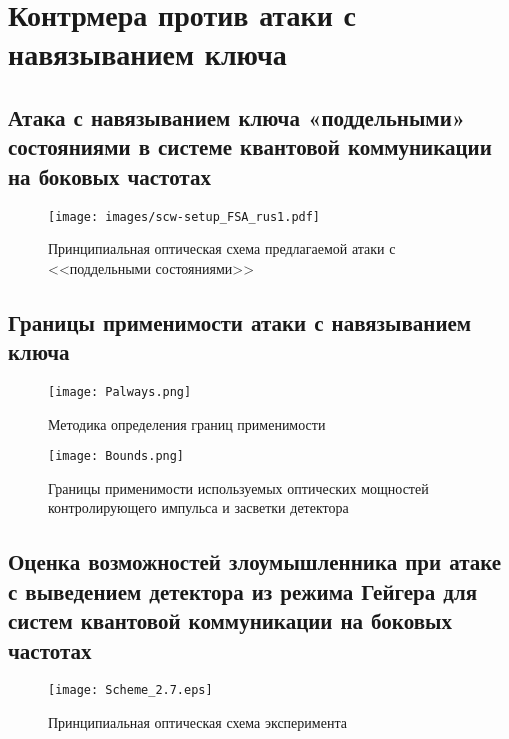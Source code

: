 \chapter{Контрмера против атаки с навязыванием ключа} \label{ch:ch3}


\section{Атака с навязыванием ключа «поддельными» состояниями в системе квантовой коммуникации на боковых частотах} \label{sec:ch3/sec1}

 \begin{figure}[ht]
  \centering
  \texttt{[image: images/scw-setup\_FSA\_rus1.pdf]}
  \caption{Принципиальная оптическая схема предлагаемой атаки с <<поддельными состояниями>>}
  \label{fig:SCW_FSA}
\end{figure}

\pagebreak
\section{Границы применимости атаки с навязыванием ключа} \label{sec:ch3/sec2}

 \begin{figure}[ht]
  \centering
  \texttt{[image: Palways.png]}
  \caption{Методика определения границ применимости}
  \label{fig:Palways}
\end{figure}


 \begin{figure}[ht]
  \centering
  \texttt{[image: Bounds.png]}
  \caption{Границы применимости используемых оптических мощностей контролирующего импульса и засветки детектора}
  \label{fig:Bounds}
\end{figure}

\pagebreak
\section{Оценка возможностей злоумышленника при атаке с выведением детектора из режима Гейгера для систем квантовой коммуникации на боковых частотах} \label{sec:ch3/sec3}
 \begin{figure}[ht]
  \centering
  \texttt{[image: Scheme\_2.7.eps]}
  \caption{Принципиальная оптическая схема эксперимента}
  \label{fig:Scheme_2.7}
\end{figure}

